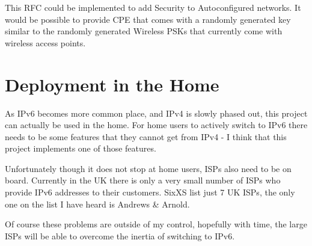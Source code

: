 \documentclass[12pt]{report}
\begin{document}
This RFC could be implemented to add Security to Autoconfigured networks. It would 
be possible to provide CPE that comes with a randomly generated key similar to the 
randomly generated Wireless PSKs that currently come with wireless access points.

\section{Deployment in the Home}
As IPv6 becomes more common place, and IPv4 is slowly phased out, this project can 
actually be used in the home. For home users to actively switch to IPv6 there needs 
to be some features that they cannot get from IPv4 - I think that this project 
implements one of those features.

Unfortunately though it does not stop at home users, ISPs also need to be on
board.  Currently in the UK there is only a very small number of ISPs who
provide IPv6 addresses to their customers. SixXS list just 7 UK ISPs, the only
one on the list I have heard is Andrews \& Arnold.

Of course these problems are outside of my control, hopefully with time, the
large ISPs will be able to overcome the inertia of switching to IPv6.
 
\pagebreak

\printnomenclature

\pagebreak

\cleardoublepage
{}
{}
{}



\end{document}
